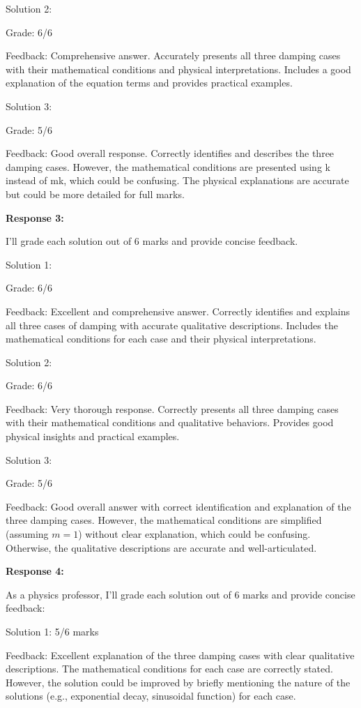 \documentclass[a4paper,11pt]{article}
\begin{document}
Solution 2:

Grade: 6/6

Feedback: Comprehensive answer. Accurately presents all three damping cases with their mathematical conditions and physical interpretations. Includes a good explanation of the equation terms and provides practical examples.

Solution 3:

Grade: 5/6

Feedback: Good overall response. Correctly identifies and describes the three damping cases. However, the mathematical conditions are presented using k instead of mk, which could be confusing. The physical explanations are accurate but could be more detailed for full marks.

\bigskip    
\textbf{Response 3:}

I'll grade each solution out of 6 marks and provide concise feedback.

Solution 1:

Grade: 6/6

Feedback: Excellent and comprehensive answer. Correctly identifies and explains all three cases of damping with accurate qualitative descriptions. Includes the mathematical conditions for each case and their physical interpretations.

Solution 2:

Grade: 6/6

Feedback: Very thorough response. Correctly presents all three damping cases with their mathematical conditions and qualitative behaviors. Provides good physical insights and practical examples.

Solution 3:

Grade: 5/6

Feedback: Good overall answer with correct identification and explanation of the three damping cases. However, the mathematical conditions are simplified (assuming \(m=1\)) without clear explanation, which could be confusing. Otherwise, the qualitative descriptions are accurate and well-articulated.

\bigskip
\textbf{Response 4:}

As a physics professor, I'll grade each solution out of 6 marks and provide concise feedback:

Solution 1: 5/6 marks

Feedback: Excellent explanation of the three damping cases with clear qualitative descriptions. The mathematical conditions for each case are correctly stated. However, the solution could be improved by briefly mentioning the nature of the solutions (e.g., exponential decay, sinusoidal function) for each case.
\end{document}
